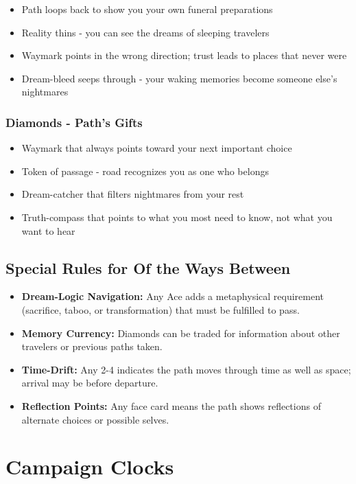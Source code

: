 \documentclass[11pt]{article}
\begin{document}
\begin{itemize}
\item Path loops back to show you your own funeral preparations
\item Reality thins - you can see the dreams of sleeping travelers
\item Waymark points in the wrong direction; trust leads to places that never were
\item Dream-bleed seeps through - your waking memories become someone else's nightmares
\end{itemize}

\subsubsection{Diamonds - Path's Gifts}

\begin{itemize}
\item Waymark that always points toward your next important choice
\item Token of passage - road recognizes you as one who belongs
\item Dream-catcher that filters nightmares from your rest
\item Truth-compass that points to what you most need to know, not what you want to hear
\end{itemize}

\subsection{Special Rules for Of the Ways Between}

\begin{itemize}
\item \textbf{Dream-Logic Navigation:} Any Ace adds a metaphysical requirement (sacrifice, taboo, or transformation) that must be fulfilled to pass.
\item \textbf{Memory Currency:} Diamonds can be traded for information about other travelers or previous paths taken.
\item \textbf{Time-Drift:} Any 2-4 indicates the path moves through time as well as space; arrival may be before departure.
\item \textbf{Reflection Points:} Any face card means the path shows reflections of alternate choices or possible selves.
\end{itemize}

\section{Campaign Clocks}
\end{document}
